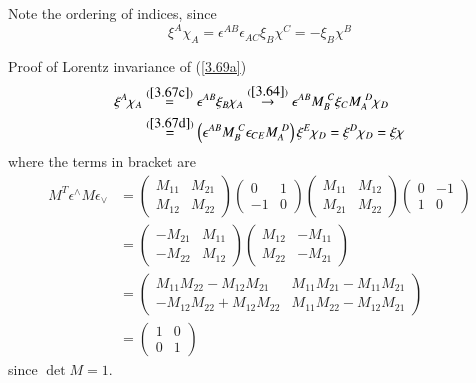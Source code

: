 Note the ordering of indices, since
\begin{equation}
   \xi^A \chi_A = \epsilon^{AB} \epsilon_{AC} \xi_B \chi^C = - \xi_B \chi^B \label{3.70}
\end{equation}

Proof of Lorentz invariance of (\ref{3.69a})
\begin{align*}
   \xi^A \chi_A &\stackrel{(\ref{3.67c})}{=} \epsilon^{AB} \xi_B \chi_A \stackrel{(\ref{3.64})}{\rightarrow} \epsilon^{AB} M_B^{\ C} \xi_C M_A^{\ D} \chi_D \\
                &\stackrel{(\ref{3.67d})}{=} \left( \epsilon^{AB}M_B^{\ C} \epsilon_{CE} M_A^{\ D} \right) \xi^E \chi_D = \xi^D \chi_D = \xi \chi
\end{align*}
where the terms in bracket are
\begin{align*}
   M^T \epsilon^{\wedge} M \epsilon_{\vee} &= \begin{pmatrix} M_{11} & M_{21} \\ M_{12} & M_{22}\end{pmatrix} \begin{pmatrix} 0 & 1 \\ -1 & 0 \end{pmatrix} \begin{pmatrix} M_{11} & M_{12} \\ M_{21} & M_{22 }\end{pmatrix} \begin{pmatrix} 0 & -1 \\ 1 & 0 \end{pmatrix} \\
   & =\begin{pmatrix} -M_{21} & M_{11} \\ -M_{22} & M_{12} \end{pmatrix} \begin{pmatrix} M_{12} & -M_{11} \\ M_{22} & -M_{21} \end{pmatrix} \\
   &= \begin{pmatrix} M_{11} M_{22} - M_{12} M_{21} & M_{11} M_{21} - M_{11} M_{21} \\ -M_{12} M_{22} + M_{12} M_{22} & M_{11} M_{22} - M_{12} M_{21}\end{pmatrix} \\
   &= \begin{pmatrix} 1 & 0 \\ 0 & 1\end{pmatrix}
\end{align*}
since $\det M = 1$.

